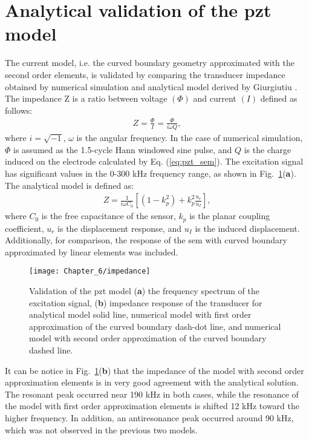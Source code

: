 \section{Analytical validation of the \acs{pzt} model}
\label{sec:pztVal}

The current model, i.e. the curved boundary geometry approximated with the second order elements, is validated by comparing the transducer impedance obtained by numerical simulation and analytical model derived by Giurgiutiu \cite{giurgiutiu2009micromechatronics}.
The impedance Z is a ratio between voltage \((\Phi)\) and current \((I)\) defined as follows:
\begin{eqnarray}
	Z = \frac{\Phi}{I} = \frac{\Phi}{i\omega Q},
\end{eqnarray}
where \(i=\sqrt{-1}\), \(\omega\) is the angular frequency.
In the case of numerical simulation, \(\Phi\) is assumed as the 1.5-cycle Hann windowed sine pulse, and \(Q\) is the charge induced on the electrode calculated by Eq. (\ref{eq:pzt_sem}). 
The excitation signal has significant values in the 0-300 \unit{\kHz} frequency range, as shown in Fig.~\ref{fig:impedance}(\textbf{a}).
The analytical model is defined as:
\begin{eqnarray}
	Z = \frac{1}{i\omega C_0}\left[\left(1-k_p^2\right)+k_p^2\frac{u_r}{u_I}\right],
\end{eqnarray}
where \(C_0\) is the free capacitance of the sensor, \(k_p\) is the planar coupling coefficient, \(u_r\) is the displacement response, and \(u_I\) is the induced displacement.
Additionally, for comparison, the response of the \ac{sem} with curved boundary approximated by linear elements was included. 
\begin{figure}[H]
	\begin{center}
		\texttt{[image: Chapter\_6/impedance]}
	\end{center}
	\caption{Validation of the \acf{pzt} model (\textbf{a}) the frequency spectrum of the excitation signal, (\textbf{b}) impedance response of the transducer for analytical model solid line, numerical model with first order approximation of the curved boundary dash-dot line, and numerical model with second order approximation of the curved boundary dashed line.}
	\label{fig:impedance}
\end{figure}

It can be notice in Fig.~\ref{fig:impedance}(\textbf{b}) that the impedance of the model with second order approximation elements is in very good agreement with the analytical solution.
The resonant peak occurred near 190 \unit{\kHz} in both cases, while the resonance of the model with first order approximation elements is shifted 12 \unit{\kHz} toward the higher frequency.
In addition, an antiresonance peak occurred around 90 \unit{\kHz}, which was not observed in the previous two models.